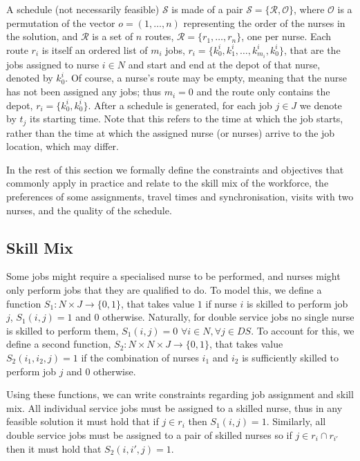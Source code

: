 \documentclass[a4paper,11pt,authoryear]{elsarticle}
\begin{document}
A schedule (not necessarily feasible) $\mathcal{S}$ is made of a pair   $\mathcal{S} = \{\mathcal{R}, \mathcal{O}\}$, where $\mathcal{O}$ is a permutation of the vector $o = (1,\dots,n)$ representing the order of the nurses in the solution, and $\mathcal{R}$ is a set of $n$ routes, $\mathcal{R} = \{r_1,\dots,r_n\}$, one per nurse. Each route $r_i$ is itself an ordered list of $m_i$ jobs, $r_i = \{k^i_0, k^i_1,\dots,k^i_{m_i}, k^i_0\}$, that are the jobs assigned to nurse $i \in N$ and start and end at the depot of that nurse, denoted by $k^i_0$. Of course, a nurse's route may be empty, meaning that the nurse has not been assigned any jobs; thus $m_i = 0$ and the route only contains the depot, $r_i = \{k^i_0, k^i_0\}$. After a schedule is generated, for each job $j \in J$ we denote by $t_j$ its starting time. Note that this refers to the time at which the job starts, rather than the time at which the assigned nurse (or nurses) arrive to the job location, which may differ.

In the rest of this section we formally define the constraints and objectives that commonly apply in practice and relate to the skill mix of the workforce, the preferences of some assignments, travel times and synchronisation, visits with two nurses, and the quality of the schedule.

\subsection{Skill Mix}
\label{sub:skillmix}
\noindent Some jobs might require a specialised nurse to be performed, and nurses might only perform jobs that they are qualified to do. To model this, we define a function $S_1: N\times J \rightarrow \{0,1\}$, that takes value $1$ if nurse $i$ is skilled to perform job $j$, $S_1(i,j) = 1$ and $0$ otherwise. 
Naturally, for double service jobs no single nurse is skilled to perform them, $S_1(i,j) = 0$ $\forall i \in N, \forall j \in DS$. To account for this, we define a second function, $S_2: N\times N\times J \rightarrow \{0,1\}$, that takes value $S_2(i_1,i_2,j) = 1$ if the combination of nurses $i_1$ and $i_2$ is sufficiently skilled to perform job $j$ and $0$ otherwise. 

Using these functions, we can write constraints regarding job assignment and skill mix.
All individual service jobs must be assigned to a skilled nurse, thus in any feasible solution it must hold that if $j \in r_i$ then $S_1(i,j) = 1$. Similarly, all double service jobs must be assigned to a pair of skilled nurses so if $j \in r_i \cap r_{i'}$ then it must hold that $S_2(i, i', j) = 1$.
\end{document}
